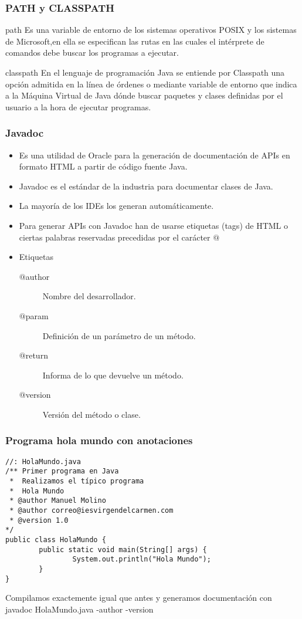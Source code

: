 \documentclass{beamer}
\begin{document}
\begin{frame}
\frametitle{PATH y CLASSPATH}
\begin{block}{path}
Es una variable de entorno de los sistemas operativos POSIX y los sistemas de Microsoft,en ella se especifican las rutas en las cuales el intérprete de comandos debe buscar los programas a ejecutar.
\end{block}
\pause
\begin{block}{classpath}
En el lenguaje de programación Java se entiende por Classpath una opción admitida en la línea de órdenes o mediante variable de entorno que indica a la Máquina Virtual de Java dónde buscar paquetes y clases definidas por el usuario a la hora de ejecutar programas.
\end{block}
\end{frame}



\begin{frame}
\frametitle{Javadoc}
\begin{itemize}[<+->]
\item Es una utilidad de Oracle para la generación de documentación de APIs en formato HTML a partir de código fuente Java.  
\item Javadoc es el estándar de la industria para documentar clases de Java.
\item La mayoría de los IDEs los generan automáticamente.
\item Para generar APIs con Javadoc han de usarse etiquetas (tags) de HTML o ciertas palabras reservadas precedidas por el carácter ${@}$
\item Etiquetas
\begin{description}
\item[$@$author] Nombre del desarrollador.
\item[$@$param] Definición de un parámetro de un método.
\item[$@$return] Informa de lo que devuelve un método.
\item[$@$version] Versión del método o clase.
\end{description}
\end{itemize}
\end{frame}

\begin{frame}[fragile]
\frametitle{Programa hola mundo con anotaciones} 
\begin{verbatim}
//: HolaMundo.java
/** Primer programa en Java
 *  Realizamos el típico programa
 *  Hola Mundo
 * @author Manuel Molino
 * @author correo@iesvirgendelcarmen.com
 * @version 1.0
*/
public class HolaMundo {
        public static void main(String[] args) {
                System.out.println("Hola Mundo");
        }
}
\end{verbatim}
\pause
Compilamos exactemente igual que antes y generamos documentación con \alert{javadoc HolaMundo.java -author -version}
\end{frame}
\end{document}
